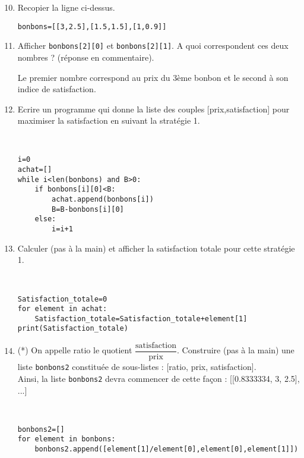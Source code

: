 \begin{enumerate}
\setcounter{enumi}{9}
\item Recopier la ligne ci-dessus.
\begin{solution}
\verb?bonbons=[[3,2.5],[1.5,1.5],[1,0.9]]?
\end{solution}
\item Afficher \verb?bonbons[2][0]? et \verb?bonbons[2][1]?. A quoi correspondent ces deux nombres ? (réponse en commentaire).
\begin{solution}
Le premier nombre correspond au prix du 3ème bonbon et le second à son indice de satisfaction.
\end{solution}
\item Ecrire un programme qui donne la liste des couples [prix,satisfaction] pour maximiser la satisfaction en suivant la stratégie 1.
\begin{solution}~ \\\vspace{-0.7cm}
\begin{verbatim}
i=0
achat=[]
while i<len(bonbons) and B>0:
    if bonbons[i][0]<B:
        achat.append(bonbons[i])
        B=B-bonbons[i][0]
    else:
        i=i+1
\end{verbatim}
\end{solution}
\item Calculer (pas à la main) et afficher la satisfaction totale pour cette stratégie 1.
\begin{solution}~ \\\vspace{-0.7cm}
\begin{verbatim}
Satisfaction_totale=0
for element in achat:
    Satisfaction_totale=Satisfaction_totale+element[1]
print(Satisfaction_totale)
\end{verbatim}
\end{solution}
\item (*) On appelle ratio le quotient $\dfrac{\text{satisfaction}}{\text{prix}}$.
Construire (pas à la main) une liste \verb?bonbons2? constituée de sous-listes : [ratio, prix, satisfaction].\\
Ainsi, la liste \verb?bonbons2? devra commencer de cette façon : [[0.8333334, 3, 2.5], ...]
\begin{solution}~ \\\vspace{-0.7cm}
\begin{verbatim}
bonbons2=[]
for element in bonbons:
    bonbons2.append([element[1]/element[0],element[0],element[1]])

\end{verbatim}
\end{solution}
\end{enumerate}
